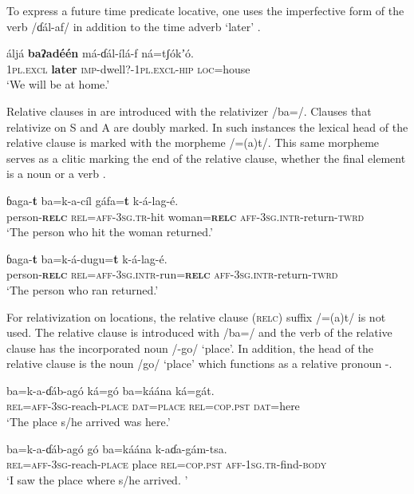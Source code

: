 \documentclass[output=paper]{langsci/langscibook}
\begin{document}
To express a future time predicate locative, one uses the imperfective form of the verb /ɗál-af/ in addition to the time adverb ‘later’ .

\ea\label{ex:ahlandc:81}
\gll
áljá    \textbf{baʔadéén}   má-ɗál-ílá-f                   ná=tʃ\'{o}kʼ\'{o}. \\
\textsc{1pl.excl}   \textbf{later}  \textsc{imp}{}-dwell?-\textsc{1pl.excl-hip} \textsc{loc}=house\\
\glt
‘We will be at home.’
\z

Relative clauses in  are introduced with the relativizer /ba=/. Clauses that relativize on S and A are doubly marked. In such instances the lexical head of the relative clause is marked with the morpheme /=(a)t/. This same morpheme serves as a clitic marking the end of the relative clause, whether the final element is a noun  or a verb . 

\ea\label{ex:ahlandc:82}
\gll
ɓaga-\textbf{t}    ba=k-a-cíl    gáfa=\textbf{t}  k-á-lag-é. \\
person-\textbf{\textsc{relc}} \textsc{    rel=aff-3sg.tr}{}-hit  woman=\textbf{\textsc{relc}} \textsc{aff-3sg.intr}{}-return-\textsc{twrd}\\
\glt
‘The person who hit the woman returned.’
\z

\ea\label{ex:ahlandc:83}
\gll
ɓaga-\textbf{t}    ba=k-á-dugu=\textbf{t}    k-á-lag-é.  \\
person-\textbf{\textsc{relc}} \textsc{    rel=aff-3sg.intr}{}-run=\textbf{\textsc{relc}} \textsc{aff-3sg.intr}{}-return-\textsc{twrd}\\
\glt
‘The person who ran returned.’
\z

For relativization on locations, the relative clause (\textsc{relc}) suffix /=(a)t/ is not used. The relative clause is introduced with /ba=/ and the verb of the relative clause has the incorporated noun /-go/ ‘place’.  In addition, the head of the relative clause is the noun /go/ ‘place’ which functions as a relative pronoun -.

\ea\label{ex:ahlandc:84}
\gll
ba=k-a-ɗáb-ag\'{o}  ká=g\'{o}  ba=káána  ká=gát. \\
\textsc{rel}\textsc{=aff-3sg}-reach-\textsc{place}  \textsc{dat=place}   \textsc{rel=cop.pst}  \textsc{dat}=here\\
\glt
 ‘The place s/he arrived was here.’
\z

\ea\label{ex:ahlandc:85}
\gll
ba=k-a-ɗáb-ag\'{o}    g\'{o}  ba=káána  k-aɗa-gám-tsa.  \\
\textsc{rel=aff-3sg}{}-reach-\textsc{place}  place  \textsc{rel=cop.pst}   \textsc{aff-1sg.tr}{}-find-\textsc{body}\\
\glt
‘I saw the place where s/he arrived. ’
\z
\end{document}
